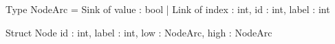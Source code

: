 \begin{blstlisting}[language=pseudo, numbers=none]
  Type NodeArc = Sink of { value : bool }
               | Link of { index : int, id : int, label : int }

  Struct Node {
    id    : int,
    label : int,
    low   : NodeArc,
    high  : NodeArc
  }
\end{blstlisting}

